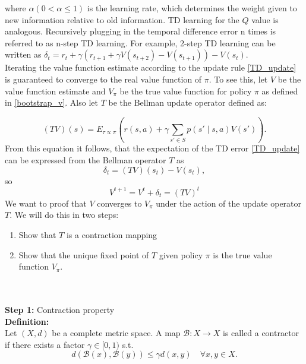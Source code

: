 where $\alpha (0 < \alpha \leq 1)$ is the learning rate, which determines the weight given to new information relative to old information. TD learning for the $Q$ 
value is analogous. Recursively plugging in the temporal difference error n times is referred to as n-step TD learning. For example, 2-step TD learning can be written as 
$\delta_t = r_t + \gamma (r_{t+1} + \gamma V(s_{t+2}) - V(s_{t+1})  ) - V(s_t)$.\\

Iterating the value function estimate according to the update rule \ref{TD_update} is guaranteed to converge to the real value function of $\pi$. To see this, 
let $V$ be the value function estimate and $V_{\pi}$ be the true value function for policy $\pi$ as defined in \ref{bootstrap_v}. Also let $T$ be the 
Bellman update operator defined as:

\begin{equation}
    (T V)(s) = E_{\tau \propto \pi} \left(r(s,a) + \gamma \sum_{s' \in S} p(s' \mid s,a) V(s')\right).
\end{equation}
From this equation it follows, that the expectation of the TD error \ref{TD_update} can be expressed from the Bellman operator $T$ as 
\begin{equation}
    \label{TD_update_BM}
    \delta_t = (T V)(s_t) - V(s_t),
\end{equation} 
so 
\begin{equation*}
    V^{t+1} = V^t + \delta_t = (T V)^t
\end{equation*}
We want to proof that $V$ converges to $V_{\pi}$ under the action of the update operator $T$. We will do this in two steps:
\begin{enumerate}
    \item Show that $T$ is a contraction mapping
    \item Show that the unique fixed point of $T$ given policy $\pi$ is the true value function $V_{\pi}$.
\end{enumerate}
\\ \\

\textbf{Step 1:} Contraction property\\
\textbf{Definition:}\\
Let $(X, d)$ be a complete metric space. A map $\mathcal{B}:X \rightarrow X$ is called a contractor if there exists a factor $\gamma \in [0, 1)$ s.t.
\begin{equation}
    d(\mathcal{B}(x), \mathcal{B}(y)) \leq \gamma d(x,y) \quad \forall x,y \in X.
\end{equation}
\\ \\

